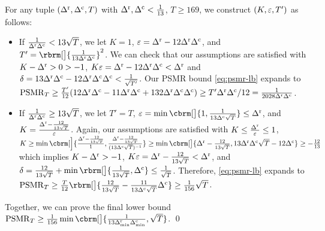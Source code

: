 For any tuple $(\Delta^{\mathrm{r}}, \Delta^{\mathrm{c}}, T)$ with $\Delta^{\mathrm{r}},\Delta^{\mathrm{c}}<\frac 1{13}$, $T\geq 169$, we construct $(K,\varepsilon,T')$ as follows:
\begin{itemize}
    \item If $\frac{1}{\Delta^{\mathrm{r}}\Delta^{\mathrm{c}}}<13\sqrt{T}$, we let $K=1$, $\varepsilon=\Delta^{\mathrm{r}}-12\Delta^{\mathrm{r}}\Delta^{\mathrm{c}}$, and $T'=\rbrm[\big]{\frac{1}{13\DeltaR\DeltaC}}^2$.
    We can check that our assumptions are satisfied with $K-\Delta^{\mathrm{r}}>0>-1$, $K\varepsilon=\Delta^{\mathrm{r}}-12\Delta^{\mathrm{r}}\Delta^{\mathrm{c}}<\Delta^{\mathrm{r}}$ and $\delta=13\Delta^{\mathrm{r}}\Delta^{\mathrm{c}}-12\Delta^{\mathrm{r}}\Delta^{\mathrm{c}}\Delta^{\mathrm{c}}<\frac{1}{\sqrt{T'}}$.
    Our PSMR bound \eqref{eq:psmr-lb} expands to $\mathrm{PSMR}_T\geq \frac{T'}{12}(12\Delta^{\mathrm{r}}\Delta^{\mathrm{c}}-11\Delta^{\mathrm{r}}\Delta^{\mathrm{c}}+132\Delta^{\mathrm{r}}\Delta^{\mathrm{c}}\Delta^{\mathrm{c}})\geq T'\Delta^{\mathrm{r}}\Delta^{\mathrm{c}}/12=\frac{1}{2028\Delta^{\mathrm{r}}\Delta^{\mathrm{c}}}$.
    \item If $\frac{1}{\Delta^{\mathrm{r}}\Delta^{\mathrm{c}}}\geq13\sqrt{T}$, we let $T'=T$, $\eps=\min\cbrm[\big]{1,\frac{1}{13\DeltaC\sqrt{T}}}\leq\DeltaR$, and $K=\frac{\Delta^{\mathrm{r}}-\frac{12}{13\sqrt{T}}}{\varepsilon}$. Again, our assumptions are satisfied with $K\leq \frac{\Delta^{\mathrm{r}}}{\varepsilon}\leq 1$, $K\geq\min\cbrm[\Big]{\frac{\DeltaR-\frac{12}{13\sqrt{T}}}{1},\frac{\DeltaR-\frac{12}{13\sqrt{T}}}{(13\DeltaC\sqrt{T})^{-1}}}\geq \min\cbrm[\big]{\DeltaR-\frac{12}{13\sqrt{T}},13\DeltaR\DeltaC\sqrt{T}-12\DeltaC}\geq -\frac{12}{13}$ which implies $K-\Delta^{\mathrm{r}}>-1$, $K\varepsilon=\Delta^{\mathrm{r}}-\frac{12}{13\sqrt T}<\Delta^{\mathrm{r}}$, and $\delta=\frac{12}{13\sqrt T}+\min\rbrm[\big]{\frac{1}{13 \sqrt{T}},\DeltaC}\leq\frac{1}{\sqrt T}$. Therefore, \eqref{eq:psmr-lb} expands to $\psmr_T\geq \frac{T}{12}\rbrm[\big]{\frac{12}{13\sqrt T}-\frac{11}{13\DeltaC\sqrt T}\DeltaC}\geq \frac1{156}\sqrt T$.
\end{itemize}
Together, we can prove the final lower bound $\psmr_T\geq \frac{1}{156}\min\cbrm[\big]{\frac{1}{13\DRmin\DCmin},\sqrt{T}}$. \qed
